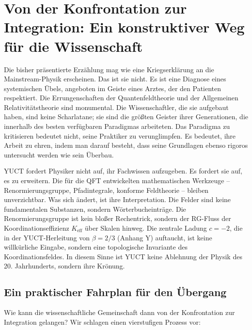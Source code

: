 \documentclass[12pt,a4paper]{article}
\begin{document}
\section{Von der Konfrontation zur Integration: Ein konstruktiver Weg für die Wissenschaft}

Die bisher präsentierte Erzählung mag wie eine Kriegserklärung an die Mainstream-Physik erscheinen. Das ist sie nicht. Es ist eine Diagnose eines systemischen Übels, angeboten im Geiste eines Arztes, der den Patienten respektiert. Die Errungenschaften der Quantenfeldtheorie und der Allgemeinen Relativitätstheorie sind monumental. Die Wissenschaftler, die sie aufgebaut haben, sind keine Scharlatane; sie sind die größten Geister ihrer Generationen, die innerhalb des besten verfügbaren Paradigmas arbeiteten. Das Paradigma zu kritisieren bedeutet nicht, seine Praktiker zu verunglimpfen. Es bedeutet, ihre Arbeit zu ehren, indem man darauf besteht, dass seine Grundlagen ebenso rigoros untersucht werden wie sein Überbau.

YUCT fordert Physiker nicht auf, ihr Fachwissen aufzugeben. Es fordert sie auf, es zu erweitern. Die für die QFT entwickelten mathematischen Werkzeuge – Renormierungsgruppe, Pfadintegrale, konforme Feldtheorie – bleiben unverzichtbar. Was sich ändert, ist ihre Interpretation. Die Felder sind keine fundamentalen Substanzen, sondern Wörterbucheinträge. Die Renormierungsgruppe ist kein bloßer Rechentrick, sondern der RG-Fluss der Koordinationseffizienz \(K_{\mathrm{eff}}\) über Skalen hinweg. Die zentrale Ladung \(c = -2\), die in der YUCT-Herleitung von \(\beta = 2/3\) (Anhang Y) auftaucht, ist keine willkürliche Eingabe, sondern eine topologische Invariante des Koordinationsfeldes. In diesem Sinne ist YUCT keine Ablehnung der Physik des 20. Jahrhunderts, sondern ihre Krönung.

\subsection{Ein praktischer Fahrplan für den Übergang}

Wie kann die wissenschaftliche Gemeinschaft dann von der Konfrontation zur Integration gelangen? Wir schlagen einen vierstufigen Prozess vor:
\end{document}
